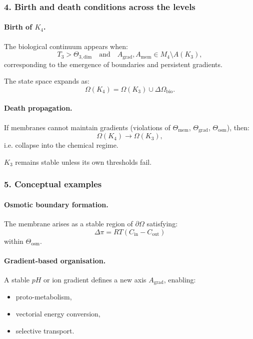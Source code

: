 \subsubsection{4. Birth and death conditions across the levels}

\paragraph{Birth of \texorpdfstring{$K_4$}{K_4}.}
The biological continuum appears when:
\[
T_3 > \Theta_{3,\mathrm{dim}}
\quad \text{and} \quad
A_{\mathrm{grad}}, A_{\mathrm{mem}} \in M_4 \setminus A(K_3),
\]
corresponding to the emergence of boundaries and persistent gradients.

The state space expands as:
\[
\Omega(K_4) = \Omega(K_3) \cup \Delta\Omega_{\mathrm{bio}}.
\]

\paragraph{Death propagation.}
If membranes cannot maintain gradients (violations of $\Theta_{\mathrm{mem}}$,
$\Theta_{\mathrm{grad}}$, $\Theta_{\mathrm{osm}}$), then:
\[
\Omega(K_4) \rightarrow \Omega(K_3),
\]
i.e. collapse into the chemical regime.

$K_3$ remains stable unless its own thresholds fail.

\subsubsection{5. Conceptual examples}

\paragraph{Osmotic boundary formation.}
The membrane arises as a stable region of $\partial\Omega$ satisfying:
\[
\Delta\pi = RT(C_{\mathrm{in}} - C_{\mathrm{out}})
\]
within $\Theta_{\mathrm{osm}}$.

\paragraph{Gradient-based organisation.}
A stable $pH$ or ion gradient defines a new axis $A_{\mathrm{grad}}$, enabling:
\begin{itemize}
  \item proto-metabolism,
  \item vectorial energy conversion,
  \item selective transport.
\end{itemize}

